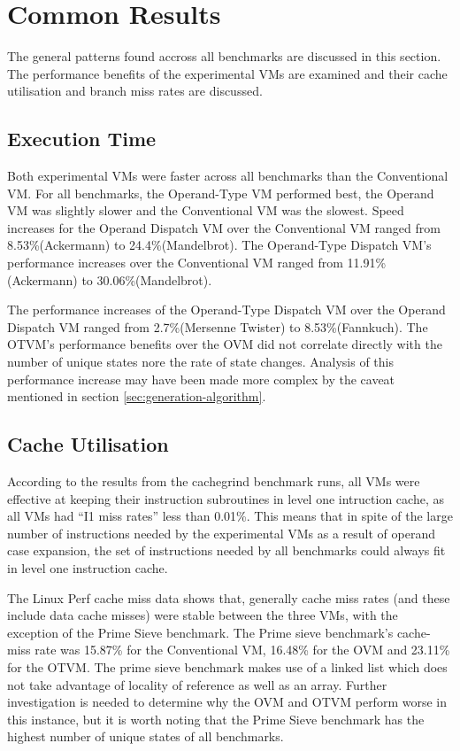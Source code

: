 \documentclass[english,a4paper,12pt]{report}
\begin{document}
\section{Common Results}

The general patterns found accross all benchmarks are discussed in
this section. The performance benefits of the experimental VMs are
examined and their cache utilisation and branch miss rates are
discussed.

\subsection{Execution Time}
Both experimental VMs were faster across all benchmarks than the
Conventional VM. For all benchmarks, the Operand-Type VM performed
best, the Operand VM was slightly slower and the Conventional VM was
the slowest. Speed increases for the Operand Dispatch VM over the
Conventional VM ranged from 8.53\%(Ackermann) to
24.4\%(Mandelbrot). The Operand-Type Dispatch VM's performance
increases over the Conventional VM ranged from 11.91\%(Ackermann) to
30.06\%(Mandelbrot).

The performance increases of the Operand-Type Dispatch VM over the
Operand Dispatch VM ranged from 2.7\%(Mersenne Twister) to
8.53\%(Fannkuch). The OTVM's performance benefits over the OVM did not
correlate directly with the number of unique states nore the rate of
state changes. Analysis of this performance increase may have been
made more complex by the caveat mentioned in section
\ref{sec:generation-algorithm}.

\subsection{Cache Utilisation}
According to the results from the cachegrind benchmark runs, all VMs
were effective at keeping their instruction subroutines in level one
intruction cache, as all VMs had ``I1 miss rates'' less than
0.01\%. This means that in spite of the large number of instructions
needed by the experimental VMs as a result of operand case expansion,
the set of instructions needed by all benchmarks could always fit in
level one instruction cache.

The Linux Perf cache miss data shows that, generally cache miss rates
(and these include data cache misses) were stable between the three
VMs, with the exception of the Prime Sieve benchmark. The Prime sieve
benchmark's cache-miss rate was 15.87\% for the Conventional VM,
16.48\% for the OVM and 23.11\% for the OTVM. The prime sieve
benchmark makes use of a linked list which does not take advantage of
locality of reference as well as an array. Further investigation is
needed to determine why the OVM and OTVM perform worse in this
instance, but it is worth noting that the Prime Sieve benchmark has
the highest number of unique states of all benchmarks.
\end{document}
